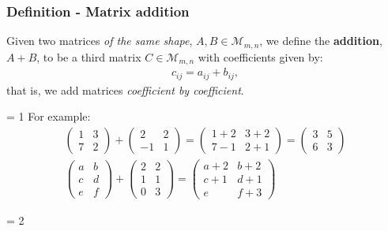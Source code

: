 \documentclass[usenames,dvipsnames,aspectratio=169,10pt]{beamer}
\def \EXAMPLEVERSION {3} %
\numberwithin{equation}{section}
\begin{document}
\begin{frame}
\frametitle{Definition - Matrix addition}
Given two matrices \textit{of the same shape}, $A,B \in \mathcal{M}_{m,n}$, we define the \textbf{addition}, $A+B$, to be a third matrix $C \in \mathcal{M}_{m,n}$ with coefficients given by:
\begin{align*}
c_{ij} = a_{ij} + b_{ij},
\end{align*}
that is, we add matrices \textit{coefficient by coefficient}.

\ifnum \EXAMPLEVERSION = 1 {
For example:
\begin{gather*}
\begin{pmatrix}
 1 & 3 \\
 7 & 2 
\end{pmatrix}
+
\begin{pmatrix}
 2 & 2 \\
-1 & 1 
\end{pmatrix}
=
\begin{pmatrix}
 1+2 & 3+2 \\
 7-1 & 2+1 
\end{pmatrix}
=
\begin{pmatrix}
 3 & 5 \\
 6 & 3 
\end{pmatrix}
\\
\begin{pmatrix}
 a & b \\
 c & d \\
 e & f 
\end{pmatrix}
+
\begin{pmatrix}
 2 & 2 \\
 1 & 1 \\
 0 & 3  
\end{pmatrix}
=
\begin{pmatrix}
 a+2 & b+2 \\
 c+1 & d+1 \\
 e   & f+3 
\end{pmatrix}
\end{gather*}
}
\fi

\ifnum \EXAMPLEVERSION = 2
\fi 


\end{frame}
\end{document}
